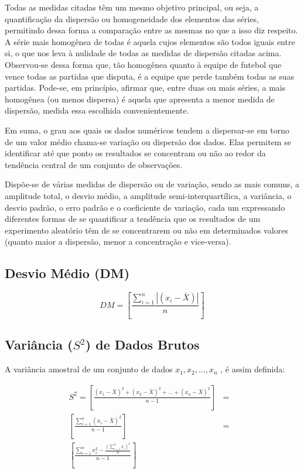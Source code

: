 Todas as medidas citadas têm um mesmo objetivo principal, ou seja, a quantificação da dispersão ou homogeneidade dos elementos das séries, permitindo dessa forma a comparação entre as mesmas no que a isso diz respeito. A série mais homogênea de todas é aquela cujos elementos são todos iguais entre si, o que nos leva à nulidade de todas as medidas de dispersão citadas acima. Observou-se dessa forma que, tão homogênea quanto à equipe de futebol que vence todas as partidas que disputa, é a equipe que perde também todas as suas partidas. Pode-se, em princípio, afirmar que, entre duas ou mais séries, a mais homogênea (ou menos dispersa) é aquela que apresenta a menor medida de dispersão, medida essa escolhida convenientemente.\vskip0.3cm

Em suma, o grau aos quais os dados numéricos tendem a dispersar-se em torno de um valor médio chama-se variação ou dispersão dos dados. Elas permitem se identificar até que ponto os resultados se concentram ou não ao redor da tendência central de um conjunto de observações.\vskip0.3cm

Dispõe-se de várias medidas de dispersão ou de variação, sendo as mais comuns, a amplitude total, o desvio médio, a amplitude semi-interquartílica, a variância, o desvio padrão, o erro padrão e o coeficiente de variação, cada um expressando diferentes formas de se quantificar a tendência que os resultados de um experimento aleatório têm de se concentrarem ou não em determinados valores (quanto maior a dispersão, menor a concentração e vice-versa).




\subsection{Desvio Médio (DM)}

\begin{equation}\label{dn}
    DM= \left[  \frac{\sum_{i=1}^{n}|(x_{i}-\bar{X})|}{n} \right]
\end{equation}

\newpage 

\subsection{Variância ($S^{2}$) de Dados Brutos}

A variância amostral de um conjunto de dados $x_{1},x_{2},\ldots,x_{n}$ , é assim definida:

\begin{eqnarray}\nonumber
S^{2} = \left[ \frac{(x_{1}-\bar{X})^{2}+(x_{2}-\bar{X})^{2}+\ldots+(x_{n}-\bar{X})^{2}}{n-1} \right]
    & = &  \\
    \left[ \frac{\sum_{i=1}^{n}(x_{i}-\bar{X})^{2}}{n-1} \right]  & = &  \\ \nonumber
    \left[ \frac{\sum_{i=1}^{n}x_{i}^{2}-\frac{(\sum_{i=1}^{n}x_{i})^{2}}{n}}{n-1} \right] &  &
\end{eqnarray}


